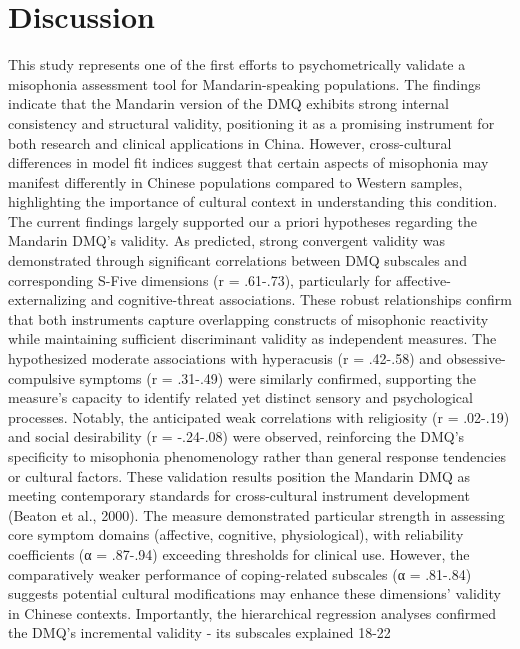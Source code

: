 \section{Discussion}
This study represents one of the first efforts to psychometrically validate a misophonia assessment tool for Mandarin-speaking populations. The findings indicate that the Mandarin version of the DMQ exhibits strong internal consistency and structural validity, positioning it as a promising instrument for both research and clinical applications in China. However, cross-cultural differences in model fit indices suggest that certain aspects of misophonia may manifest differently in Chinese populations compared to Western samples, highlighting the importance of cultural context in understanding this condition.
The current findings largely supported our a priori hypotheses regarding the Mandarin DMQ’s validity. As predicted, strong convergent validity was demonstrated through significant correlations between DMQ subscales and corresponding S-Five dimensions (r = .61-.73), particularly for affective-externalizing and cognitive-threat associations. These robust relationships confirm that both instruments capture overlapping constructs of misophonic reactivity while maintaining sufficient discriminant validity as independent measures. The hypothesized moderate associations with hyperacusis (r = .42-.58) and obsessive-compulsive symptoms (r = .31-.49) were similarly confirmed, supporting the measure’s capacity to identify related yet distinct sensory and psychological processes. Notably, the anticipated weak correlations with religiosity (r = .02-.19) and social desirability (r = -.24-.08) were observed, reinforcing the DMQ’s specificity to misophonia phenomenology rather than general response tendencies or cultural factors.
These validation results position the Mandarin DMQ as meeting contemporary standards for cross-cultural instrument development (Beaton et al., 2000). The measure demonstrated particular strength in assessing core symptom domains (affective, cognitive, physiological), with reliability coefficients (α = .87-.94) exceeding thresholds for clinical use. However, the comparatively weaker performance of coping-related subscales (α = .81-.84) suggests potential cultural modifications may enhance these dimensions’ validity in Chinese contexts. Importantly, the hierarchical regression analyses confirmed the DMQ's incremental validity - its subscales explained 18-22%
